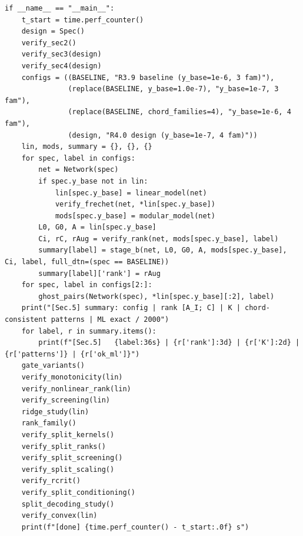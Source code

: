 \documentclass[11pt,a4paper]{article}
\theoremstyle{definition}
\theoremstyle{remark}
\begin{document}
\begin{lstlisting}
if __name__ == "__main__":
    t_start = time.perf_counter()
    design = Spec()
    verify_sec2()
    verify_sec3(design)
    verify_sec4(design)
    configs = ((BASELINE, "R3.9 baseline (y_base=1e-6, 3 fam)"),
               (replace(BASELINE, y_base=1.0e-7), "y_base=1e-7, 3 fam"),
               (replace(BASELINE, chord_families=4), "y_base=1e-6, 4 fam"),
               (design, "R4.0 design (y_base=1e-7, 4 fam)"))
    lin, mods, summary = {}, {}, {}
    for spec, label in configs:
        net = Network(spec)
        if spec.y_base not in lin:
            lin[spec.y_base] = linear_model(net)
            verify_frechet(net, *lin[spec.y_base])
            mods[spec.y_base] = modular_model(net)
        L0, G0, A = lin[spec.y_base]
        Ci, rC, rAug = verify_rank(net, mods[spec.y_base], label)
        summary[label] = stage_b(net, L0, G0, A, mods[spec.y_base], Ci, label, full_dtn=(spec == BASELINE))
        summary[label]['rank'] = rAug
    for spec, label in configs[2:]:
        ghost_pairs(Network(spec), *lin[spec.y_base][:2], label)
    print("[Sec.5] summary: config | rank [A_I; C] | K | chord-consistent patterns | ML exact / 2000")
    for label, r in summary.items():
        print(f"[Sec.5]   {label:36s} | {r['rank']:3d} | {r['K']:2d} | {r['patterns']} | {r['ok_ml']}")
    gate_variants()
    verify_monotonicity(lin)
    verify_nonlinear_rank(lin)
    verify_screening(lin)
    ridge_study(lin)
    rank_family()
    verify_split_kernels()
    verify_split_ranks()
    verify_split_screening()
    verify_split_scaling()
    verify_rcrit()
    verify_split_conditioning()
    split_decoding_study()
    verify_convex(lin)
    print(f"[done] {time.perf_counter() - t_start:.0f} s")
\end{lstlisting}
\end{document}

